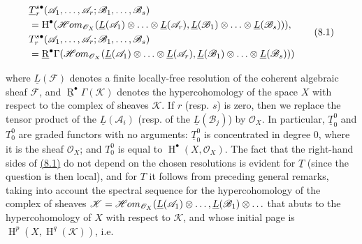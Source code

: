 \documentclass{article}
\newenvironment{eqenv}
  {}
  {}
\theoremstyle{definition}
\theoremstyle{definition}
\theoremstyle{definition}
\theoremstyle{definition}
\theoremstyle{remark}
\begin{document}
\leavevmode{}%
\begin{eqenv}
\[
  \begin{aligned}
    &\underline{T}_r^{s\bullet}({\mathscr{A}}_1,\ldots,{\mathscr{A}}_r;{\mathscr{B}}_1,\ldots,{\mathscr{B}}_s)
  \\&= \operatorname{H}^\bullet(\mathscr{H}\kern -.5pt om_{{\mathscr{O}}_X}(\underline{L}({\mathscr{A}}_1)\otimes\ldots\otimes\underline{L}({\mathscr{A}}_r), \underline{L}({\mathscr{B}}_1)\otimes\ldots\otimes\underline{L}({\mathscr{B}}_s))),
  \\&T_r^{s\bullet}({\mathscr{A}}_1,\ldots,{\mathscr{A}}_r;{\mathscr{B}}_1,\ldots,{\mathscr{B}}_s)
  \\&= \underline{\operatorname{R}}^\bullet\Gamma(\mathscr{H}\kern -.5pt om_{{\mathscr{O}}_X}(\underline{L}({\mathscr{A}}_1)\otimes\ldots\otimes\underline{L}({\mathscr{A}}_r), \underline{L}({\mathscr{B}}_1)\otimes\ldots\otimes\underline{L}({\mathscr{B}}_s)))
  \end{aligned}
\tag{8.1}
\]

\end{eqenv}

where \(\underline{L}({\mathscr{F}})\) denotes a finite locally-free resolution of the coherent algebraic sheaf \({\mathscr{F}}\), and \(\underline{\operatorname{R}}^\bullet\Gamma({\mathscr{K}})\) denotes the hypercohomology of the space \(X\) with respect to the complex of sheaves \({\mathscr{K}}\).
If \(r\) (resp. \(s\)) is zero, then we replace the tensor product of the \(\underline{L}({\mathscr{A}}_i)\) (resp. of the \(\underline{L}({\mathscr{B}}_j)\)) by \({\mathscr{O}}_X\).
In particular, \(\underline{T}_0^0\) and \(T_0^0\) are graded functors with no arguments:
\(\underline{T}_0^0\) is concentrated in degree \(0\), where it is the sheaf \({\mathscr{O}}_X\);
and \(T_0^0\) is equal to \(\operatorname{H}^\bullet(X,{\mathscr{O}}_X)\).
The fact that the right-hand sides of \protect\hyperlink{fga-1-equation-8.1}{(8.1)} do not depend on the chosen resolutions is evident for \(\underline{T}\) (since the question is then local), and for \(T\) it follows from preceding general remarks, taking into account the spectral sequence for the hypercohomology of the complex of sheaves \({\mathscr{K}}=\mathscr{H}\kern -.5pt om_{{\mathscr{O}}_X}(\underline{L}({\mathscr{A}}_1)\otimes\ldots,\underline{L}({\mathscr{B}}_1)\otimes\ldots\) that abuts to the hypercohomology of \(X\) with respect to \({\mathscr{K}}\), and whose initial page is \(\operatorname{H}^p(X,\operatorname{H}^q({\mathscr{K}}))\), i.e.
\end{document}
